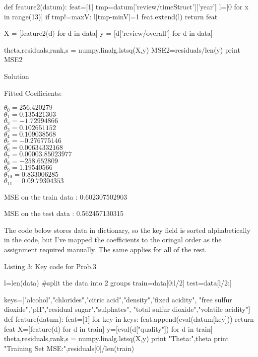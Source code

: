 \documentclass{assignment}
\begin{document}
\begin{problemlist}
\begin{python}
def feature2(datum):
    feat=[1]
    tmp=datum['review/timeStruct']['year']
    l=[0 for x in range(13)]
    if tmp!=maxV:
        l[tmp-minV]=1
    feat.extend(l)
    return feat

X = [feature2(d) for d in data]
y = [d['review/overall'] for d in data]

theta,residuals,rank,s = numpy.linalg.lstsq(X,y)
MSE2=residuals/len(y)
print MSE2
\end{python}

\pbitem Solution

Fitted Coefficients:

$\theta_0=256.420279$\\
$\theta_1=0.135421303$\\
$\theta_2=-1.72994866$\\
$\theta_3=0.102651152$\\
$\theta_4=0.109038568$\\
$\theta_5=-0.276775146$\\
$\theta_6=0.00634332168$\\
$\theta_7=0.00003.85023977$\\
$\theta_8= -258.652809$\\
$\theta_9=1.19540566$\\
$\theta_{10}=0.833006285$\\
$\theta_{11}=0.09.79304353$

\vspace{3ex}

MSE on the train data : 0.602307502903

MSE on the test data : 0.562457130315

The code below stores data in dictionary, so the key field is sorted alphabetically in the code, but I've mapped the coefficients to the oringal
order as the assignment required manually. The same applies for all of the rest.

\begin{center} 
Listing 3: Key code for Prob.3
\end{center}
\begin{python}
l=len(data)     #split the data into 2 groups
train=data[0:l/2]
test=data[l/2:]

keys=["alcohol","chlorides","citric acid","density","fixed acidity",
	"free sulfur dioxide","pH","residual sugar","sulphates",
	"total sulfur dioxide","volatile acidity"]
def feature(datum):
    feat=[1]
    for key in keys:
        feat.append(eval(datum[key]))
    return feat
X=[feature(d) for d in train]
y=[eval(d["quality"]) for d in train]
theta,residuals,rank,s = numpy.linalg.lstsq(X,y)
print "Theta:",theta
print "Training Set MSE:",residuals[0]/len(train)


\end{python}
\end{problemlist}
\end{document}
